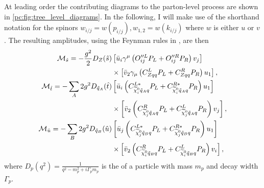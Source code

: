 \documentclass[../main.tex]{subfiles}
\begin{document}
At leading order the contributing diagrams to the parton-level process are
shown in \cref{pc:fig:tree_level_diagrams}. In the following, I will make use
of the shorthand notation for the spinors \(w_{i/j} = w(p_{i/j}), w_{1,2} =
w(k_{i/j})\) where \(w\) is either \(u\) or \(v\). The resulting amplitudes,
using the Feynman rules in , are then
\begin{subequations}
	\begin{align}
		\nonumber
		\M_{\hat{s}} = -\frac{g^2}{2} D_Z(\hat{s})           &
		\bclosed{ \bar{u}_i\gamma^\mu\pclosed{O^{\prime\prime
						L}_{ij}P_L +
				O^{\prime\prime R}_{ij}P_R} v_j }
		\\
		                                                     & \times
		\bclosed{ \bar{v}_2 \gamma_\mu \pclosed{C^L_{Zqq}P_L +
		C^R_{Zqq}P_R} u_1 },
		\\
		\nonumber
		\M_{\hat{t}} = -\sum_A 2g^2 D_{\tilde{q}_A}(\hat{t}) &
		\bclosed{ \bar{u}_i
			\pclosed{C_{\nino[i]\tilde{q}_Aq}^{L\ast}P_L +
				C_{\nino[i]\tilde{q}_Aq}^{R\ast} P_R} u_1 }
		\\
		                                                     & \times
		\bclosed{ \bar{v}_2 \pclosed{C^R_{\nino[j]\tilde{q}_Aq}P_L +
		C^L_{\nino[j]\tilde{q}_Aq}P_R} v_j },
		\\
		\nonumber
		\M_{\hat{u}} = -\sum_B 2g^2 D_{\tilde{q}_B}(\hat{u}) &
		\bclosed{ \bar{u}_j
			\pclosed{C_{\nino[j]\tilde{q}_Bq}^{L\ast}P_L +
				C_{\nino[j]\tilde{q}_Bq}^{R\ast} P_R} u_1 }
		\\
		                                                     & \times
		\bclosed{ \bar{v}_2 \pclosed{C^R_{\nino[i]\tilde{q}_Bq}P_L +
		C^L_{\nino[i]\tilde{q}_Bq}P_R} v_i },
	\end{align}
\end{subequations}
where \(D_p(q^2) = \frac{1}{q^2 - m_p^2 + i\Gamma_p m_p}\) is the
 of a particle with mass \(m_p\) and decay
width \(\Gamma_p\).
\end{document}
